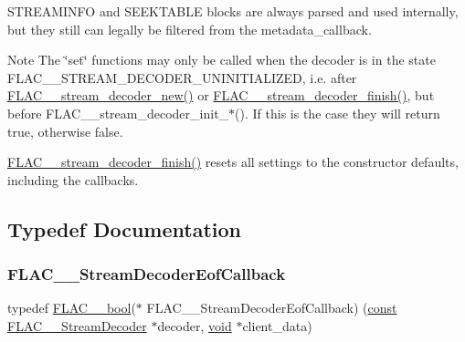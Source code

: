 S\+T\+R\+E\+A\+M\+I\+N\+FO and S\+E\+E\+K\+T\+A\+B\+LE blocks are always parsed and used internally, but they still can legally be filtered from the metadata\+\_\+callback.

\begin{DoxyNote}{Note}
The \char`\"{}set\char`\"{} functions may only be called when the decoder is in the state F\+L\+A\+C\+\_\+\+\_\+\+S\+T\+R\+E\+A\+M\+\_\+\+D\+E\+C\+O\+D\+E\+R\+\_\+\+U\+N\+I\+N\+I\+T\+I\+A\+L\+I\+Z\+ED, i.\+e. after \hyperlink{group__flac__stream__decoder_ga7159eefc074dfbab4a37462f69326091}{F\+L\+A\+C\+\_\+\+\_\+stream\+\_\+decoder\+\_\+new()} or \hyperlink{group__flac__stream__decoder_gaa51bb38f762ee11b320a0839f165c5ce}{F\+L\+A\+C\+\_\+\+\_\+stream\+\_\+decoder\+\_\+finish()}, but before F\+L\+A\+C\+\_\+\+\_\+stream\+\_\+decoder\+\_\+init\+\_\+$\ast$(). If this is the case they will return {\ttfamily true}, otherwise {\ttfamily false}.

\hyperlink{group__flac__stream__decoder_gaa51bb38f762ee11b320a0839f165c5ce}{F\+L\+A\+C\+\_\+\+\_\+stream\+\_\+decoder\+\_\+finish()} resets all settings to the constructor defaults, including the callbacks. 
\end{DoxyNote}


\subsection{Typedef Documentation}
\mbox{\label{group__flac__stream__decoder_ga4eac094fc609363532d90cf8374b4f7e}} 
\subsubsection{\texorpdfstring{F\+L\+A\+C\+\_\+\+\_\+\+Stream\+Decoder\+Eof\+Callback}{FLAC\_\_StreamDecoderEofCallback}}
{\footnotesize\ttfamily typedef \hyperlink{ordinals_8h_a95103469f1cbd78b8cf250194985b34e}{F\+L\+A\+C\+\_\+\+\_\+bool}($\ast$ F\+L\+A\+C\+\_\+\+\_\+\+Stream\+Decoder\+Eof\+Callback) (\hyperlink{zconf_8h_a2c212835823e3c54a8ab6d95c652660e}{const} \hyperlink{struct_f_l_a_c_____stream_decoder}{F\+L\+A\+C\+\_\+\+\_\+\+Stream\+Decoder} $\ast$decoder, \hyperlink{png_8h_ac9c84fa68bbad002983e35ce3663c686}{void} $\ast$client\+\_\+data)}

